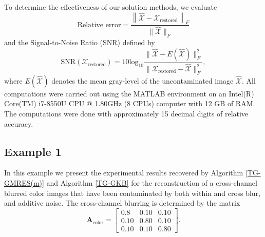 \documentclass{siamltex}
\newcommand{\1}{\mathbb{1}}
\newcommand{\0}{\mathbb{0}}
\begin{document}
	To determine the effectiveness of our solution methods, we evaluate 
	$$\text{Relative error}=\frac{\left\|\hat{ \mathscr X}-{\mathscr  X}_{\text{restored}}\right\|_{F}}{\|\widehat{ \mathscr X}\|_{F}}$$
	and the Signal-to-Noise
	Ratio (SNR) defined by
	\[\text{SNR}({ \mathscr X}_{\text{restored}})=10\text{log}_{10}\frac{\|\widehat{\mathscr X}-E(\widehat{\mathscr X})\|_F^2}{\|{\mathscr X}_{\text{restored}}-\widehat{\mathscr X}\|_F^2},\]
	where $E(\widehat{\mathscr X})$ denotes the mean gray-level of the uncontaminated image $\widehat{\mathscr{X}}$. 
	All computations were carried out using the MATLAB environment on an Intel(R) Core(TM) i7-8550U CPU @ 1.80GHz (8 CPUs) computer with 12 GB of
	RAM. The computations were done with approximately 15 decimal digits of relative
	accuracy. 
	\subsection{Example 1}
	In this example we present the experimental results recovered by Algorithm \ref{TG-GMRES(m)} and Algorithm \ref{TG-GKB} for the reconstruction of a cross-channel blurred color images that have been contaminated by both within and cross blur, and additive noise. The cross-channel blurring is determined by the matrix 
	$$\mathbf{A}_{\mathrm{color}}=\left[\begin{array}{ccc}
	0.8 & 0.10& 0.10 \\
	0.10 & 0.80 & 0.10 \\
	0.10& 0.10 & 0.80
	\end{array}\right].$$
\end{document}
